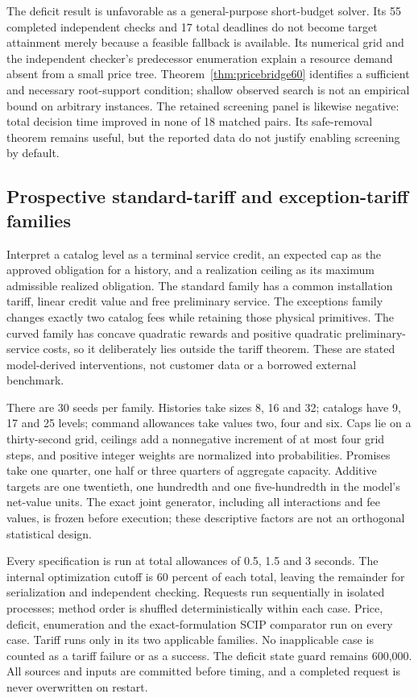 \documentclass[11pt,letterpaper]{article}
\theoremstyle{definition}\newtheorem{remark}[theorem]{Remark}
\begin{document}
The deficit result is unfavorable as a general-purpose short-budget solver. Its 55 completed independent checks and 17 total deadlines do not become target attainment merely because a feasible fallback is available. Its numerical grid and the independent checker's predecessor enumeration explain a resource demand absent from a small price tree. Theorem~\ref{thm:pricebridge60} identifies a sufficient and necessary root-support condition; shallow observed search is not an empirical bound on arbitrary instances. The retained screening panel is likewise negative: total decision time improved in none of 18 matched pairs. Its safe-removal theorem remains useful, but the reported data do not justify enabling screening by default.

\subsection{Prospective standard-tariff and exception-tariff families}
Interpret a catalog level as a terminal service credit, an expected cap as the approved obligation for a history, and a realization ceiling as its maximum admissible realized obligation. The standard family has a common installation tariff, linear credit value and free preliminary service. The exceptions family changes exactly two catalog fees while retaining those physical primitives. The curved family has concave quadratic rewards and positive quadratic preliminary-service costs, so it deliberately lies outside the tariff theorem. These are stated model-derived interventions, not customer data or a borrowed external benchmark.

There are 30 seeds per family. Histories take sizes 8, 16 and 32; catalogs have 9, 17 and 25 levels; command allowances take values two, four and six. Caps lie on a thirty-second grid, ceilings add a nonnegative increment of at most four grid steps, and positive integer weights are normalized into probabilities. Promises take one quarter, one half or three quarters of aggregate capacity. Additive targets are one twentieth, one hundredth and one five-hundredth in the model's net-value units. The exact joint generator, including all interactions and fee values, is frozen before execution; these descriptive factors are not an orthogonal statistical design.

Every specification is run at total allowances of 0.5, 1.5 and 3 seconds. The internal optimization cutoff is 60 percent of each total, leaving the remainder for serialization and independent checking. Requests run sequentially in isolated processes; method order is shuffled deterministically within each case. Price, deficit, enumeration and the exact-formulation SCIP comparator run on every case. Tariff runs only in its two applicable families. No inapplicable case is counted as a tariff failure or as a success. The deficit state guard remains 600,000. All sources and inputs are committed before timing, and a completed request is never overwritten on restart.
\end{document}
